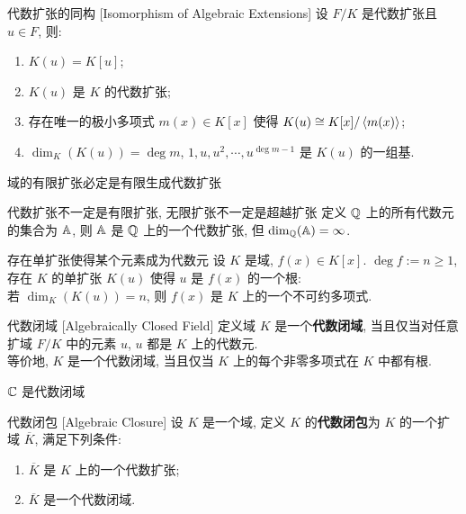         \begin{thm}
            {代数扩张的同构}
            [Isomorphism of Algebraic Extensions]
            设 \(F/K\) 是代数扩张且 \(u\in F\), 则:
            \begin{enumerate}
                \item \(K(u)=K[u]\);
                \item \(K(u)\) 是 \(K\) 的代数扩张;
                \item 存在唯一的极小多项式 \(m(x)\in K[x]\) 使得 \(K(u)\cong K[x]/\expval{m(x)} \);
                \item \(\dim_K (K(u)) = \deg m\), \(1, u, u^2, \cdots, u^{\deg m-1}\) 是 \(K(u)\) 的一组基.
            \end{enumerate}
        \end{thm}

        \begin{ppt}
            {域的有限扩张必定是有限生成代数扩张}
        \end{ppt}

        \begin{cxmp}
            {代数扩张不一定是有限扩张, 无限扩张不一定是超越扩张}
            定义 \(\operatorname{\mathbb{Q}}\) 上的所有代数元的集合为 \(\operatorname{\mathbb{A}}\), 则 \(\operatorname{\mathbb{A}}\) 是 \(\operatorname{\mathbb{Q}}\) 上的一个代数扩张, 但 \(\dim_{\operatorname{\mathbb{Q}}}(\operatorname{\mathbb{A}})=\infty\).
        \end{cxmp}

        \begin{thm}
            {存在单扩张使得某个元素成为代数元}
            设 \(K\) 是域, \(f(x)\in K[x]\). \(\deg f:=n\geq 1\), 存在 \(K\) 的单扩张 \(K(u)\) 使得 \(u\) 是 \(f(x)\) 的一个根:\\
            若 \(\dim_{K} (K(u))=n\), 则 \(f(x)\) 是 \(K\) 上的一个不可约多项式.
        \end{thm}

        \begin{dfn}
            {代数闭域}
            [Algebraically Closed Field]
            定义域 \(K\) 是一个\textbf{代数闭域}, 当且仅当对任意扩域 \(F/K\) 中的元素 \(u\), \(u\) 都是 \(K\) 上的代数元.\\
            等价地, \(K\) 是一个代数闭域, 当且仅当 \(K\) 上的每个非零多项式在 \(K\) 中都有根.
        \end{dfn}

        \begin{ins}
            {\(\operatorname{\mathbb{C}}\) 是代数闭域}
        \end{ins}

        \begin{dfn}
            {代数闭包}
            [Algebraic Closure]
            设 \(K\) 是一个域, 定义 \(K\) 的\textbf{代数闭包}为 \(K\) 的一个扩域 \(\overline{K}\), 满足下列条件:
            \begin{enumerate}
                \item \(\overline{K}\) 是 \(K\) 上的一个代数扩张;
                \item \(\overline{K}\) 是一个代数闭域.
            \end{enumerate}
        \end{dfn}

